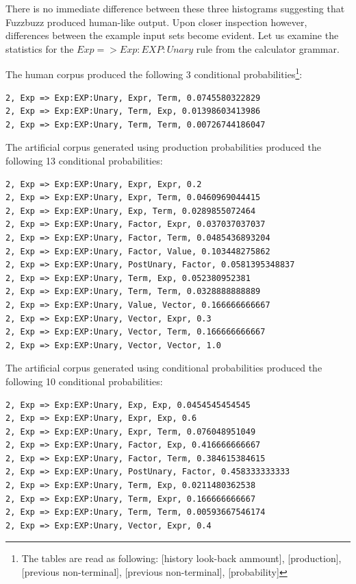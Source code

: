 There is no immediate difference between these three histograms suggesting that
Fuzzbuzz produced human-like output. Upon closer inspection however, differences
between the example input sets become evident. Let us examine the statistics for
the $Exp => Exp:EXP:Unary$ rule from the calculator grammar.

The human corpus produced the following 3 conditional
probabilities\footnote{The tables are read as following: [history look-back
ammount], [production], [previous non-terminal], [previous non-terminal],
[probability]}: \\

\noindent
\begin{verbatim}
2, Exp => Exp:EXP:Unary, Expr, Term, 0.0745580322829
2, Exp => Exp:EXP:Unary, Term, Exp, 0.01398603413986
2, Exp => Exp:EXP:Unary, Term, Term, 0.00726744186047
\end{verbatim}


The artificial corpus generated using production probabilities produced the
following 13 conditional probabilities: \\

\noindent
\begin{verbatim}
2, Exp => Exp:EXP:Unary, Expr, Expr, 0.2
2, Exp => Exp:EXP:Unary, Expr, Term, 0.0460969044415
2, Exp => Exp:EXP:Unary, Exp, Term, 0.0289855072464
2, Exp => Exp:EXP:Unary, Factor, Expr, 0.037037037037
2, Exp => Exp:EXP:Unary, Factor, Term, 0.0485436893204
2, Exp => Exp:EXP:Unary, Factor, Value, 0.103448275862
2, Exp => Exp:EXP:Unary, PostUnary, Factor, 0.0581395348837
2, Exp => Exp:EXP:Unary, Term, Exp, 0.052380952381
2, Exp => Exp:EXP:Unary, Term, Term, 0.0328888888889
2, Exp => Exp:EXP:Unary, Value, Vector, 0.166666666667
2, Exp => Exp:EXP:Unary, Vector, Expr, 0.3
2, Exp => Exp:EXP:Unary, Vector, Term, 0.166666666667
2, Exp => Exp:EXP:Unary, Vector, Vector, 1.0
\end{verbatim}

The artificial corpus generated using conditional probabilities produced the
following 10 conditional probabilities: \\

\noindent
\begin{verbatim}
2, Exp => Exp:EXP:Unary, Exp, Exp, 0.0454545454545
2, Exp => Exp:EXP:Unary, Expr, Exp, 0.6
2, Exp => Exp:EXP:Unary, Expr, Term, 0.076048951049
2, Exp => Exp:EXP:Unary, Factor, Exp, 0.416666666667
2, Exp => Exp:EXP:Unary, Factor, Term, 0.384615384615
2, Exp => Exp:EXP:Unary, PostUnary, Factor, 0.458333333333
2, Exp => Exp:EXP:Unary, Term, Exp, 0.0211480362538
2, Exp => Exp:EXP:Unary, Term, Expr, 0.166666666667
2, Exp => Exp:EXP:Unary, Term, Term, 0.00593667546174
2, Exp => Exp:EXP:Unary, Vector, Expr, 0.4
\end{verbatim}

